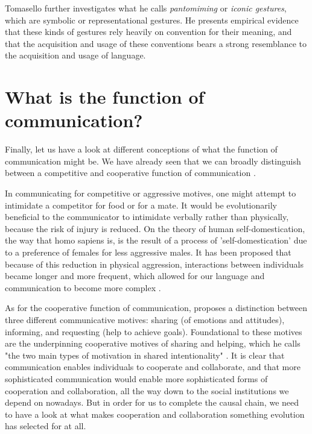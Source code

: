 Tomasello further investigates what he calls \emph{pantomiming} or \emph{iconic gestures}, which are symbolic or representational gestures. 
He presents empirical evidence that these kinds of gestures rely heavily on convention for their meaning, and that the acquisition and usage of these conventions bears a strong resemblance to the acquisition and usage of language.

\section{What is the function of communication?}
\label{sec:comm:function}

Finally, let us have a look at different conceptions of what the function of communication might be. We have already seen that we can broadly distinguish between a competitive and cooperative function of communication \citep{SeyfarthCheney03}.

In communicating for competitive or aggressive motives, one might attempt to intimidate a competitor for food or for a mate. It would be evolutionarily beneficial to the communicator to intimidate verbally rather than physically, because the risk of injury is reduced.
On the theory of human self-domestication, the way that homo sapiens is, is the result of a process of 'self-domestication' due to a preference of females for less aggressive males. It has been proposed that because of this reduction in physical aggression, interactions between individuals became longer and more frequent, which allowed for our language and communication to become more complex \citep{Benitez21}.

As for the cooperative function of communication, \citet{Tomasello08-origins} proposes a distinction between three different communicative motives: sharing (of emotions and attitudes), informing, and requesting (help to achieve goals). Foundational to these motives are the underpinning cooperative motives of sharing and helping, which he calls "the two main types of motivation in shared intentionality" \citep[p.~123]{Tomasello08-origins}.
It is clear that communication enables individuals to cooperate and collaborate, and that more sophisticated communication would enable more sophisticated forms of cooperation and collaboration, all the way down to the social institutions we depend on nowadays.
But in order for us to complete the causal chain, we need to have a look at what makes cooperation and collaboration something evolution has selected for at all.

